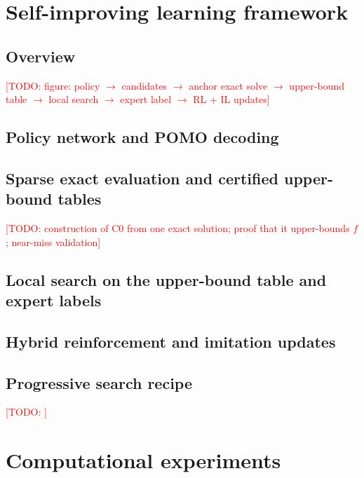 \documentclass[preprint,review,12pt,authoryear]{elsarticle}
\newcommand{\todo}[1]{\textcolor{red}{[TODO: #1]}}
\begin{document}
\section{Self-improving learning framework}\label{sec:method}
\subsection{Overview}
\todo{figure: policy $\to$ candidates $\to$ anchor exact solve $\to$ upper-bound table $\to$ local search $\to$ expert label $\to$ RL + IL updates}
\subsection{Policy network and POMO decoding}
\subsection{Sparse exact evaluation and certified upper-bound tables}
\todo{construction of C0 from one exact solution; proof that it upper-bounds $f$; near-miss validation}
\subsection{Local search on the upper-bound table and expert labels}
\subsection{Hybrid reinforcement and imitation updates}
\subsection{Progressive search recipe}
\begin{algorithm}[t]
\caption{Self-improving training (one batch)}\label{alg:train}
\begin{algorithmic}[1]
\State \todo{}
\end{algorithmic}
\end{algorithm}

\section{Computational experiments}\label{sec:exp}
\end{document}
